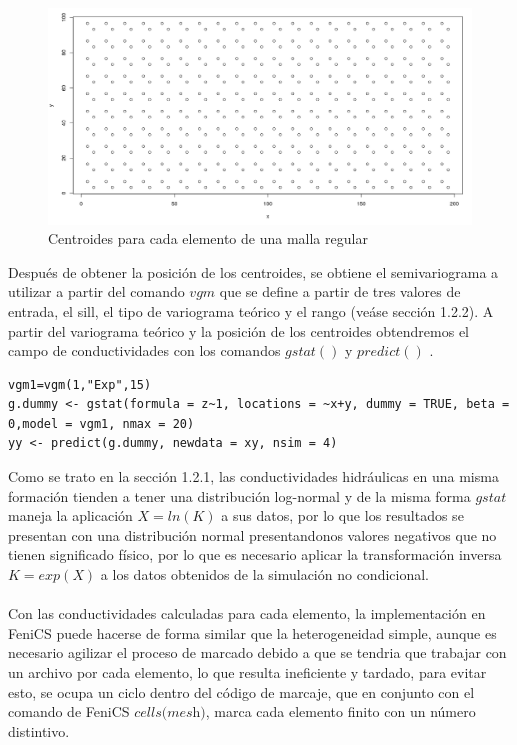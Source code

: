 \begin{figure}[ht!]
\centering
\includegraphics[scale=0.45]{Figura_22.png}
\caption{ Centroides para cada elemento de una malla regular }
\label{Figura20:2}
\end{figure}

Después de obtener la posición de los centroides, se obtiene el semivariograma a utilizar a partir del comando $\textit{vgm}$ que se define a partir de tres valores de entrada, el sill, el tipo de variograma teórico y el rango (veáse sección 1.2.2). A partir del variograma teórico y la posición de los centroides obtendremos el campo de conductividades con los comandos $gstat()$ y $predict()$ \cite{Gonzalez2000} \cite{Pebesma2014}.

\lstset{language=r,breaklines=true, basicstyle=\footnotesize}
\begin{lstlisting}[frame=single]
vgm1=vgm(1,"Exp",15)
g.dummy <- gstat(formula = z~1, locations = ~x+y, dummy = TRUE, beta = 0,model = vgm1, nmax = 20)
yy <- predict(g.dummy, newdata = xy, nsim = 4)
\end{lstlisting}

Como se trato en la sección 1.2.1, las conductividades hidráulicas en una misma formación tienden a tener una distribución log-normal y de la misma forma $gstat$ maneja la aplicación  $X=ln(K)$ a sus datos, por lo que los resultados se presentan con una distribución normal presentandonos valores negativos que no tienen significado físico, por lo que es necesario aplicar la transformación inversa $K=exp(X)$ a los datos obtenidos de la simulación no condicional.
 \\
 \\
Con las conductividades calculadas para cada elemento, la implementación en FeniCS puede hacerse de forma similar que la heterogeneidad simple, aunque es necesario agilizar el proceso de marcado debido a que se tendria que trabajar con un archivo por cada elemento, lo que resulta ineficiente y tardado, para evitar esto, se ocupa un ciclo dentro del código de marcaje, que en conjunto con el comando de FeniCS $\textit{cells(mesh)}$, marca cada elemento finito con un número distintivo.

